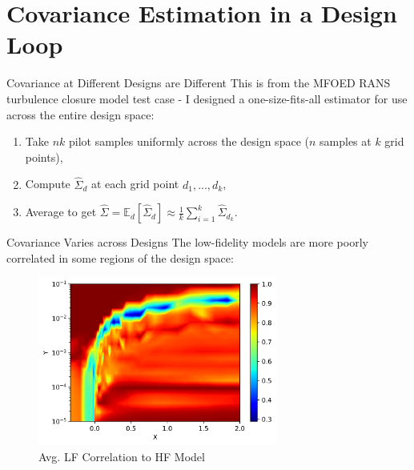 \documentclass[usenames,dvipsnames]{beamer}
\theoremstyle{definition}
\begin{document}
\section[Estimation]{Covariance Estimation in a Design Loop}
\begin{frame}{Covariance at Different Designs are Different}
    This is from the MFOED RANS turbulence closure model test case - I designed a one-size-fits-all estimator for use across the entire design space:
    \begin{enumerate}
        \item Take $nk$ pilot samples uniformly across the design space ($n$ samples at $k$ grid points),
        \item Compute $\hat{\Sigma}_{d}$ at each grid point $d_{1},...,d_{k}$,
        \item Average to get $\hat{\Sigma} = \mathbb{E}_{d}[\hat{\Sigma}_{d}] \approx \frac{1}{k}\sum_{i=1}^{k}\hat{\Sigma}_{d_{k}}$.
    \end{enumerate}
\end{frame}

\begin{frame}{Covariance Varies across Designs}
    The low-fidelity models are more poorly correlated in some regions of the design space:
    \begin{figure}
        \centering
        \includegraphics[width=0.7\textwidth]{fig/corrs_contour.png}
        \caption{Avg. LF Correlation to HF Model}
        \label{fig:corrs_contour}
    \end{figure}
\end{frame}
\end{document}
